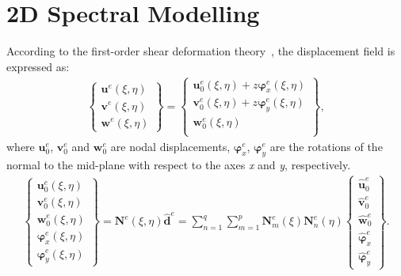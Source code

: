 \section{2D Spectral Modelling}
\label{sec:2Dmodel}


According to the first-order shear deformation theory~\cite{reissner1945effect, mindlin1951influence}, the displacement field is expressed as:
\begin{eqnarray}
	\left \{ \begin{array}{c}
		\textbf{u}^e(\xi,\eta) \\
		\textbf{v}^e(\xi,\eta) \\
		\textbf{w}^e(\xi,\eta)
	\end{array} \right\} = 
	\left \{ \begin{array}{c}
		\textbf{u}_0^e(\xi,\eta) + z\boldsymbol{\varphi}_x^e(\xi,\eta)\\
		\textbf{v}_0^e(\xi,\eta) + z\boldsymbol{\varphi}_y^e(\xi,\eta)\\
		\textbf{w}_0^e(\xi,\eta) \\
	\end{array} \right\},
\end{eqnarray}
where \(\textbf{u}_0^e\), \(\textbf{v}_0^e\) and \(\textbf{w}_0^e\) are nodal displacements, \(\boldsymbol{\varphi}_x^e\), \(\boldsymbol{\varphi}_y^e\) are the rotations of the normal to the mid-plane with respect to the axes \textit{x} and \textit{y}, respectively.
\begin{eqnarray}
	\left \{\begin{array}{c}
		\textbf{u}_0^e(\xi,\eta) \\
		\textbf{v}_0^e(\xi,\eta) \\
		\textbf{w}_0^e(\xi,\eta) \\
		\boldsymbol{\varphi}_x^e(\xi,\eta) \\
		\boldsymbol{\varphi}_y^e(\xi,\eta)
	\end{array} \right\}
	= \textbf{N}^e(\xi,\eta)\widehat{\textbf{d}}^e
	= \sum_{n=1}^q\sum_{m=1}^p\textbf{N}_m^e(\xi)\textbf{N}_n^e(\eta)
	\left \{ \begin{array}{c}
		\widehat{\textbf{u}}_0^e \\
		\widehat{\textbf{v}}_0^e \\
		\widehat{\textbf{w}}_0^e \\
		\widehat{\boldsymbol{\varphi}}_x^e \\
		\widehat{\boldsymbol{\varphi}}_y^e
	\end{array} \right \}.
\end{eqnarray}

